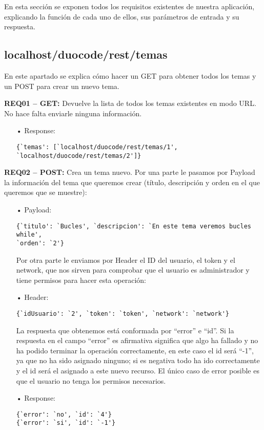 En esta sección se exponen todos los requisitos existentes de nuestra aplicación, explicando la función de cada uno de ellos, sus parámetros de entrada y su respuesta.

\subsection{localhost/duocode/rest/temas}
En este apartado se explica cómo hacer un GET para obtener todos los temas y un POST para crear un nuevo tema.
\vspace{1em}

\textbf{REQ01 – GET:} Devuelve la lista de todos los temas existentes en modo URL. No hace falta enviarle ninguna información. 

\begin{itemize}
\item[•] Response:
{\codesize
\begin{verbatim}
{`temas': [`localhost/duocode/rest/temas/1', 
`localhost/duocode/rest/temas/2']}
\end{verbatim}
}
\end{itemize}

\textbf{REQ02 – POST:} Crea un tema nuevo. Por una parte le pasamos por Payload la información del tema que queremos crear (título, descripción y orden en el que queremos que se muestre): 
\begin{itemize}
\item[•]Payload: 
{\codesize
\begin{verbatim}
{`titulo': `Bucles', `descripcion': `En este tema veremos bucles while', 
`orden': `2'} 
\end{verbatim}
}

Por otra parte le enviamos por Header el ID del usuario, el token y el network, que nos sirven para comprobar que el usuario es administrador y tiene permisos para hacer esta operación:
\item[•]Header:
{\codesize
\begin{verbatim}
{`idUsuario': `2', `token': `token', `network': `network'}
\end{verbatim}
}

La respuesta que obtenemos está conformada por ``error'' e ``id''. Si la respuesta en el campo ``error'' es afirmativa significa que algo ha fallado y no ha podido terminar la operación correctamente, en este caso el id será ``-1'', ya que no ha sido asignado ninguno; si es negativa todo ha ido correctamente y el id será el asignado a este nuevo recurso. El único caso de error posible es que el usuario no tenga los permisos necesarios.
\item[•]Response:
{\codesize
\begin{verbatim}
{`error': `no', `id': `4'}
{`error': `si', `id': `-1'}
\end{verbatim}
}
\end{itemize}

